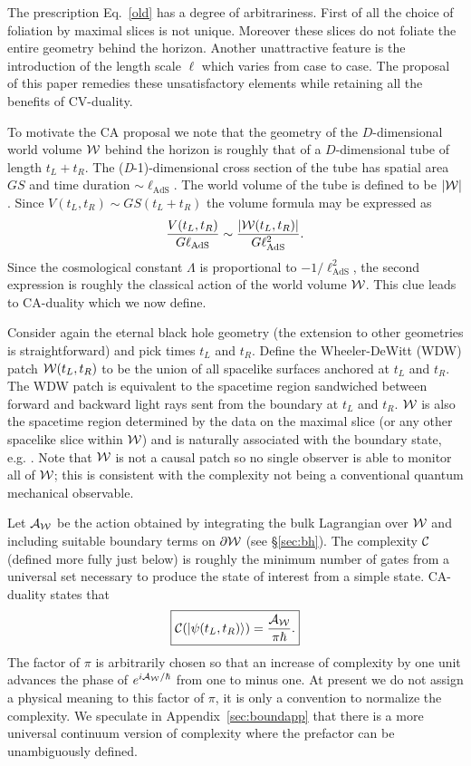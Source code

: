 \documentclass[12pt]{article}
\numberwithin{equation}{section}
\newcommand{\beq}{\begin{equation}}
\newcommand{\eeq}{\end{equation}}
\def\CA{{\cal A}}
\def\CC{{\cal C}}
\def\CW{{\cal W}}
\newcommand{\ket}[1]{| #1 \rangle }
\newcommand{\lads}{\ell_{\text{AdS}}}
\begin{document}
The prescription Eq.~\ref{old} has a degree of arbitrariness. First of all the choice of foliation by maximal slices is not  unique. Moreover these slices do not foliate the entire geometry behind the horizon. Another unattractive feature is the introduction of the length scale $\ell$ which varies from case to case. The proposal of this paper remedies
 these unsatisfactory elements while retaining all the benefits of CV-duality.

To motivate the CA proposal we note that the geometry of the $D$-dimensional world volume $\CW$ behind the horizon is roughly that of a $D$-dimensional tube of length $t_L+t_R.$  The (\emph{D}-1)-dimensional cross section of the tube has spatial area $GS$ and time duration $\sim \ell_{\text{AdS}}.$ The world volume of the tube is defined to be $|\CW|$.
 Since $V(t_L,t_R) \sim G S (t_L + t_R)$ the volume formula may be expressed as
\beq
\frac{V(t_L,t_R)}{G \ell_{\text{AdS}}} \sim \frac{|\CW(t_L,t_R)|}{G \lads^2}.
\eeq
Since the cosmological constant $\Lambda$ is proportional to $-1 / \lads^2$, the second expression is roughly the classical action of the world volume $\CW$. This clue leads to CA-duality which we now define.

Consider again the eternal black hole geometry (the extension to other geometries is straightforward) and pick times $t_L$ and $t_R$. Define the Wheeler-DeWitt (WDW) patch $\CW(t_L,t_R)$ to be the union of all spacelike surfaces anchored at $t_L$ and $t_R$. The WDW patch is equivalent to the spacetime region sandwiched between forward and backward light rays sent from the boundary at $t_L$ and $t_R$. $\CW$ is also the spacetime region determined by the data on the maximal slice (or any other spacelike slice within $\CW$) and is naturally associated with the boundary state, e.g. \cite{transhorizon}. Note that $\CW$ is not a causal patch so no single observer is able to monitor all of $\CW$; this is consistent with the complexity not being a conventional quantum mechanical observable.

Let $\CA_\CW$ be the action obtained by integrating the bulk Lagrangian over $\CW$ and including suitable boundary terms on $\partial \CW$ (see \S\ref{sec:bh}). The complexity $\CC$  (defined more fully just below) is roughly the minimum number of gates from a universal set necessary to produce the state of interest from a simple state. CA-duality states that
\beq
\boxed{
\CC(\ket{\psi(t_L,t_R)}) = \frac{\CA_\CW}{\pi \hbar}.} \label{eq:Boxed-CA}
\eeq
The factor of $\pi$ is arbitrarily chosen so that an increase of complexity by one unit advances the phase of $e^{i \CA_\CW/\hbar}$ from one to minus one.
At present we do not assign a physical meaning to this factor of $\pi$, it is only a convention to normalize the complexity.  We speculate in Appendix~\ref{sec:boundapp} that there is a more universal continuum version of complexity where the prefactor can be unambiguously defined.
\end{document}
